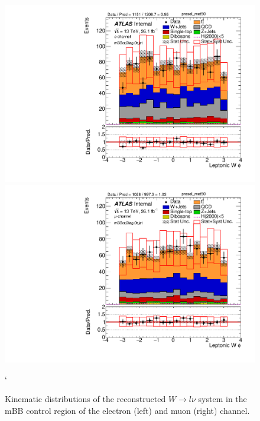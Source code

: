 \begin{figure}[!h]
\begin{center}
\includegraphics[scale=0.33]{./figures/boosted/PlotByChannels/DataMC_2tag_0bjet_mbbcr_elec_presel_met50_WlepPhi} 
\includegraphics[scale=0.33]{./figures/boosted/PlotByChannels/DataMC_2tag_0bjet_mbbcr_muon_presel_met50_WlepPhi} 
\caption{Kinematic distributions of the reconstructed $W \to l\nu$ system in the mBB control region of the electron (left) and muon (right) channel.}`
\label{fig:boosted_mbbcrleptons_wlep}
\end{center}
\end{figure}

